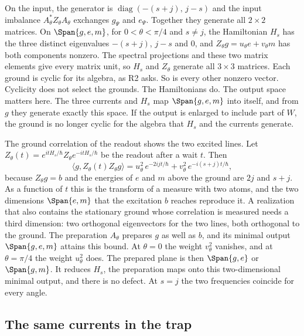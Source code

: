 On the input, the generator is $\operatorname{diag}(-(s+j),\,j-s)$ and the input imbalance $A_\theta^*Z_\theta A_\theta$ exchanges $g_\Psi$ and $e_\Psi$. Together they generate all $2\times2$ matrices. On $\Span\{g,e,m\}$, for $0<\theta<\pi/4$ and $s\ne j$, the Hamiltonian $H_s$ has the three distinct eigenvalues $-(s+j)$, $j-s$ and $0$, and $Z_\theta g=u_\theta e+v_\theta m$ has both components nonzero. The spectral projections and these two matrix elements give every matrix unit, so $H_s$ and $Z_\theta$ generate all $3\times3$ matrices. Each ground is cyclic for its algebra, as R2 asks. So is every other nonzero vector. Cyclicity does not select the grounds. The Hamiltonians do. The output space matters here. The three currents and $H_s$ map $\Span\{g,e,m\}$ into itself, and from $g$ they generate exactly this space. If the output is enlarged to include part of $W$, the ground is no longer cyclic for the algebra that $H_s$ and the currents generate.

The ground correlation of the readout shows the two excited lines. Let $Z_\theta(t)=e^{itH_s/\hbar}Z_\theta e^{-itH_s/\hbar}$ be the readout after a wait $t$. Then
\begin{equation}
 \langle g,Z_\theta(t)Z_\theta g\rangle
 =u_\theta^2\,e^{-2ijt/\hbar}+v_\theta^2\,e^{-i(s+j)t/\hbar},
 \label{eq:pair-currents-correlation}
\end{equation}
because $Z_\theta g=b$ and the energies of $e$ and $m$ above the ground are $2j$ and $s+j$. As a function of $t$ this is the transform of a measure with two atoms, and the two dimensions $\Span\{e,m\}$ that the excitation $b$ reaches reproduce it. A realization that also contains the stationary ground whose correlation is measured needs a third dimension: two orthogonal eigenvectors for the two lines, both orthogonal to the ground. The preparation $A_\theta$ prepares $g$ as well as $b$, and its minimal output $\Span\{g,e,m\}$ attains this bound. At $\theta=0$ the weight $v_\theta^2$ vanishes, and at $\theta=\pi/4$ the weight $u_\theta^2$ does. The prepared plane is then $\Span\{g,e\}$ or $\Span\{g,m\}$. It reduces $H_s$, the preparation maps onto this two-dimensional minimal output, and there is no defect. At $s=j$ the two frequencies coincide for every angle.

\subsection{The same currents in the trap}
\label{subsec:pair-currents-orbital}

